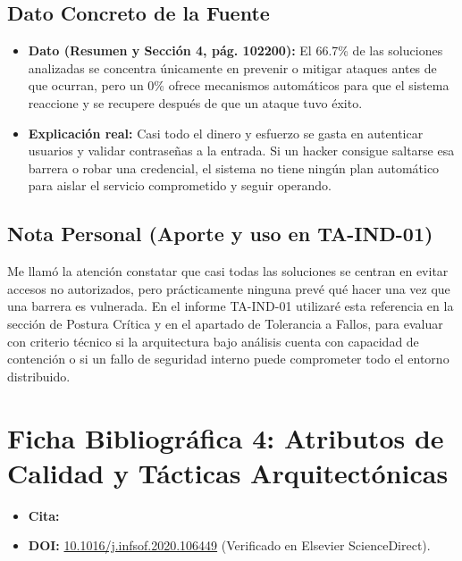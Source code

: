 \documentclass[11pt,a4paper]{article}
\begin{document}
\subsection*{Dato Concreto de la Fuente}
\begin{itemize}[leftmargin=1.2em]
    \item \textbf{Dato (Resumen y Sección 4, pág. 102200):} El 66.7\% de las soluciones analizadas se concentra únicamente en prevenir o mitigar ataques antes de que ocurran, pero un 0\% ofrece mecanismos automáticos para que el sistema reaccione y se recupere después de que un ataque tuvo éxito.
    \item \textbf{Explicación real:} Casi todo el dinero y esfuerzo se gasta en autenticar usuarios y validar contraseñas a la entrada. Si un hacker consigue saltarse esa barrera o robar una credencial, el sistema no tiene ningún plan automático para aislar el servicio comprometido y seguir operando.
\end{itemize}

\subsection*{Nota Personal (Aporte y uso en TA-IND-01)}
Me llamó la atención constatar que casi todas las soluciones se centran en evitar accesos no autorizados, pero prácticamente ninguna prevé qué hacer una vez que una barrera es vulnerada. En el informe TA-IND-01 utilizaré esta referencia en la sección de Postura Crítica y en el apartado de Tolerancia a Fallos, para evaluar con criterio técnico si la arquitectura bajo análisis cuenta con capacidad de contención o si un fallo de seguridad interno puede comprometer todo el entorno distribuido.

\newpage

\section{Ficha Bibliográfica 4: Atributos de Calidad y Tácticas Arquitectónicas}

\begin{itemize}[leftmargin=1.2em]
    \item \textbf{Cita:} 
    \item \textbf{DOI:} \href{https://doi.org/10.1016/j.infsof.2020.106449}{10.1016/j.infsof.2020.106449} (Verificado en Elsevier ScienceDirect).
\end{itemize}
\end{document}
